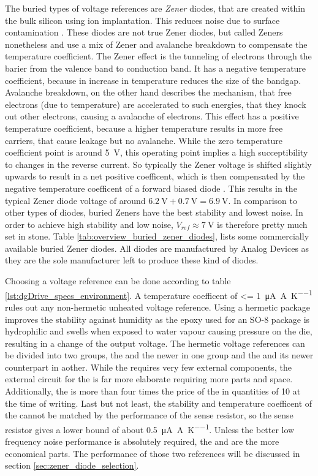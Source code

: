 The buried types of voltage references are \textit{Zener} diodes, that are created within the bulk silicon using ion implantation. This reduces noise due to surface contamination \cite{zener_diode_stability}. These diodes are not true Zener diodes, but called Zeners nonetheless and use a mix of Zener and avalanche breakdown to compensate the temperature coefficient. The Zener effect is the tunneling of electrons through the barier from the valence band to conduction band. It  has a negative temperature coefficient, because in increase in temperature reduces the size of the bandgap. Avalanche breakdown, on the other hand describes the mechanism, that free electrons (due to temperature) are accelerated to such energies, that they knock out other electrons, causing a avalanche of electrons. This effect has a positive temperature coefficient, because a higher temperature results in more free carriers, that cause leakage but no avalanche. While the zero temperature coefficient point is around \qty{5}{\V}, this operating point implies a high succeptibility to changes in the reverse current. So typically the Zener voltage is shifted slightly upwards to result in a net positive coefficent, which is then compensated by the negative temperature coefficent of a forward biased diode \cite{zener_diode_stability}. This results in the typical Zener diode voltage of around $\qty{6.2}{\V} + \qty{0.7}{\V} = \qty{6.9}{\V}$. In comparison to other types of diodes, buried Zeners have the best stability and lowest noise. In order to achieve high stability and low noise, $V_{ref} \approx \qty{7}{\V}$ is therefore pretty much set in stone. Table \ref{tab:overview_buried_zener_diodes}, lists some commercially available buried Zener diodes. All diodes are manufactured by Analog Devices as they are the sole manufacturer left to produce these kind of diodes.

Choosing a voltage reference can be done according to table \ref{lst:dgDrive_specs_environment}. A temperature coefficent of \qty{<= 1}{\uA \per \A \per \K} rules out any non-hermetic unheated voltage reference. Using a hermetic package improves the stability against humidity as the epoxy used for an SO-8 package is hydrophilic and swells when exposed to water vapour causing pressure on the die, resulting in a change of the output voltage. The hermetic voltage references can be divided into two groups, the  and the newer  in one group and the  and its newer counterpart  in aother. While the  requires very few external components, the external circuit for the  is far more elaborate requiring more parts and space. Additionally, the  is more than four times the price of the  in quantities of \num{10} at the time of writing. Last but not least, the stability and temperature coefficent of the  cannot be matched by the performance of the sense resistor, so the sense resistor gives a lower bound of about \qty{0.5}{\uA \per \A \per \K}. Unless the better low frequency noise performance is absolutely required, the  and  are the more economical parts. The performance of those two references will be discussed in section \ref{sec:zener_diode_selection}.

